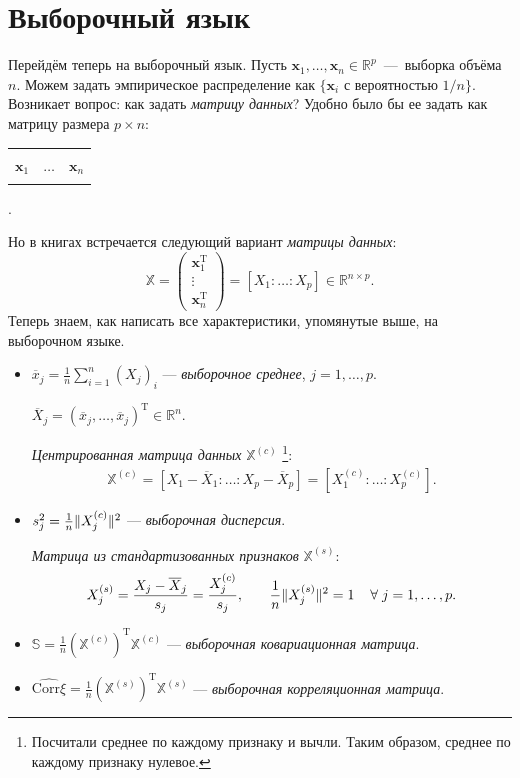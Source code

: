 \documentclass[specialist, 12pt,
subf, %
href, colorlinks=true,
substylefile = spbu.rtx,
]{disser}
\begin{document}
\section{Выборочный язык}
Перейдём теперь на выборочный язык. Пусть $\mathbf{x}_1, \ldots, \mathbf{x}_n \in \mathbb{R}^p$~---~выборка объёма $n$. Можем задать эмпирическое распределение как $\{\mathbf{x}_i \text{ с вероятностью } 1/n\}$. Возникает вопрос: как задать \textit{матрицу данных}? Удобно было бы ее задать как матрицу размера $p \times n$:
\begin{table}[H]
	\centering
	\begin{tabular}{|c|c|c|}
		\hline
		&          &                \\
		$\mathbf{x}_1$ & $\ldots$ & $\mathbf{x}_n$ \\
		&          &   \\
		\hline
	\end{tabular}.
\end{table}
Но в книгах встречается следующий вариант \textit{матрицы данных}:
$$\mathbb{X} = \begin{pmatrix}
\mathbf{x}_1^{\mathrm{T}}\\
\vdots\\
\mathbf{x}_n^{\mathrm{T}}
\end{pmatrix} =
[X_1: \ldots: X_p] \in \mathbb{R}^{n \times p}.$$
Теперь знаем, как написать все характеристики, упомянутые выше, на выборочном языке.
\begin{itemize}
	\item $\overline{x}_j = \frac{1}{n}\sum \limits_{i = 1}^{n} (X_j)_i$ --- \textit{выборочное среднее}, $j=1,\ldots,p$.
	
	 $\overline{X}_j=(\overline{x}_j,\ldots,\overline{x}_j)^\mathrm{T} \in \mathbb{R}^n.$
	
	
	\textit{Центрированная матрица данных} $\mathbb{X}^{(c)}$ \footnote{Посчитали среднее по каждому признаку и вычли. Таким образом, среднее по каждому признаку нулевое.}:
	\begin{gather*}
	\mathbb{X}^{(c)} = [X_1 - \overline{X}_1: \ldots: X_p - \overline{X}_p]=[X_1^{(c)}:\ldots: X_p^{(c)}].
	\end{gather*}
	\item $s^2_j = \frac{1}{n} \Arrowvert X_j^{(c)}\Arrowvert^2$ --- \textit{выборочная дисперсия}.
	
	\textit{Матрица из стандартизованных признаков} $\mathbb{X}^{(s)}$:
	\begin{gather*}
	X_j^{(s)} = \frac{X_j - \overline{X}_j}{s_j} = \frac{X_j^{(c)}}{s_j}, \hspace{0.64 cm} \frac{1}{n}\Arrowvert X_j^{(s)}\Arrowvert^2 = 1 \hspace{0.4 cm} \forall \hspace{0.1 cm} j=1,\ldots, p.
	\end{gather*}
	
	\item $\mathbb{S} = \frac{1}{n}(\mathbb{X}^{(c)})^{\mathrm{T}}\mathbb{X}^{(c)}$ --- \textit{выборочная ковариационная матрица}.
	\item $\widehat{\mathrm{Corr} \xi} = \frac{1}{n}(\mathbb{X}^{(s)})^{\mathrm{T}}\mathbb{X}^{(s)}$ --- \textit{выборочная корреляционная матрица}.
\end{itemize}
\end{document}
